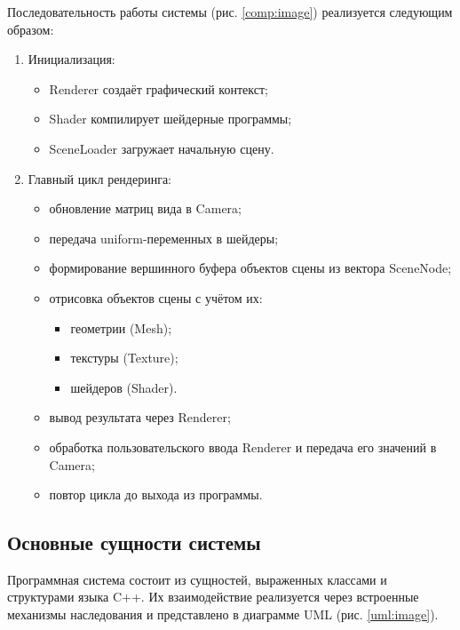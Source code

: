 Последовательность работы системы (рис. \ref{comp:image}) реализуется следующим образом:

\begin{enumerate}
    \item Инициализация:

    \begin{itemize}[itemindent=\parindent,leftmargin=\parindent]
        \item Renderer создаёт графический контекст;
        \item Shader компилирует шейдерные программы;
        \item SceneLoader загружает начальную сцену.
    \end{itemize}

    \item Главный цикл рендеринга:

    \begin{itemize}[itemindent=\parindent,leftmargin=\parindent]
        \item обновление матриц вида в Camera;
        \item передача uniform-переменных в шейдеры;
        \item формирование вершинного буфера объектов сцены из вектора SceneNode;
        \item отрисовка объектов сцены с учётом их:

        \begin{itemize}[itemindent=\parindent,leftmargin=\parindent]
            \item геометрии (Mesh);
            \item текстуры (Texture);
            \item шейдеров (Shader).
        \end{itemize}

        \item вывод результата через Renderer;
        \item обработка пользовательского ввода Renderer и передача его значений в Camera;
        \item повтор цикла до выхода из программы.
    \end{itemize}
\end{enumerate}

\subsection{Основные сущности системы}

Программная система состоит из сущностей, выраженных классами и структурами языка C++. Их взаимодействие реализуется через встроенные механизмы наследования и представлено в диаграмме UML (рис. \ref{uml:image}).

